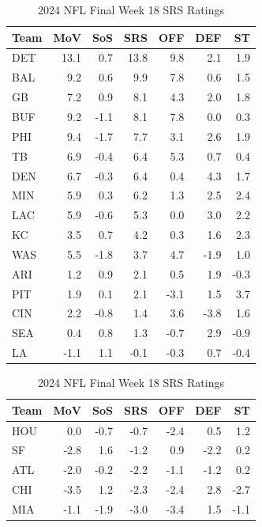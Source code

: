 \documentclass{report}
\begin{document}
\begin{table}[ht]
    \centering
    \caption{2024 NFL Final Week 18 SRS Ratings}\label{tab:srs_2024}
    \begin{tabular}{ | l | r r r r r r | }
        \hline
        \hline
        Team & MoV & SoS & SRS & OFF & DEF & ST\\
        \hline
        DET & 13.1 & 0.7 & 13.8 & 9.8 & 2.1 & 1.9 \\
        BAL & 9.2 & 0.6 & 9.9 & 7.8 & 0.6 & 1.5 \\
        GB & 7.2 & 0.9 & 8.1 & 4.3 & 2.0 & 1.8 \\
        BUF & 9.2 & -1.1 & 8.1 & 7.8 & 0.0 & 0.3 \\
        PHI & 9.4 & -1.7 & 7.7 & 3.1 & 2.6 & 1.9 \\
        TB & 6.9 & -0.4 & 6.4 & 5.3 & 0.7 & 0.4 \\
        DEN & 6.7 & -0.3 & 6.4 & 0.4 & 4.3 & 1.7 \\
        MIN & 5.9 & 0.3 & 6.2 & 1.3 & 2.5 & 2.4 \\
        LAC & 5.9 & -0.6 & 5.3 & 0.0 & 3.0 & 2.2 \\
        KC & 3.5 & 0.7 & 4.2 & 0.3 & 1.6 & 2.3 \\
        WAS & 5.5 & -1.8 & 3.7 & 4.7 & -1.9 & 1.0 \\
        ARI & 1.2 & 0.9 & 2.1 & 0.5 & 1.9 & -0.3 \\
        PIT & 1.9 & 0.1 & 2.1 & -3.1 & 1.5 & 3.7 \\
        CIN & 2.2 & -0.8 & 1.4 & 3.6 & -3.8 & 1.6 \\
        SEA & 0.4 & 0.8 & 1.3 & -0.7 & 2.9 & -0.9 \\
        LA & -1.1 & 1.1 & -0.1 & -0.3 & 0.7 & -0.4 \\
    \hline
    \hline
    \end{tabular}
    \begin{tabular}{ | l | r r r r r r | }
        \hline
        \hline
        Team & MoV & SoS & SRS & OFF & DEF & ST\\
        \hline
        HOU & 0.0 & -0.7 & -0.7 & -2.4 & 0.5 & 1.2 \\
        SF & -2.8 & 1.6 & -1.2 & 0.9 & -2.2 & 0.2 \\
        ATL & -2.0 & -0.2 & -2.2 & -1.1 & -1.2 & 0.2 \\
        CHI & -3.5 & 1.2 & -2.3 & -2.4 & 2.8 & -2.7 \\
        MIA & -1.1 & -1.9 & -3.0 & -3.4 & 1.5 & -1.1 \\

\end{tabular}
\end{table}
\end{document}
